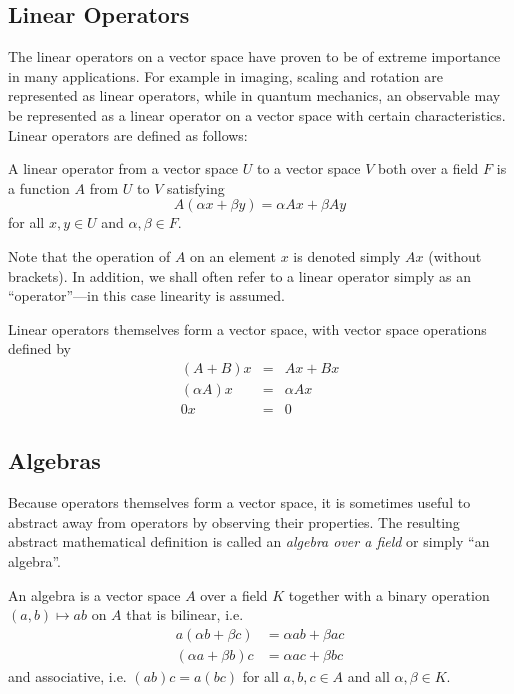\documentclass[12pt]{report}
\begin{document}
\subsection{Linear Operators}
\label{operators}

The linear operators on a vector space have proven to be of extreme importance in many applications. For example in imaging, scaling and rotation are represented as linear operators, while in quantum mechanics, an observable may be represented as a linear operator on a vector space with certain characteristics. Linear operators are defined as follows:
\begin{defn}
A linear operator from a vector space $U$ to a vector space $V$ both over a field $F$ is a function $A$ from $U$ to $V$ satisfying
$$A(\alpha x + \beta y) = \alpha Ax + \beta Ay$$
for all $x,y \in U$ and $\alpha, \beta \in F$.
\end{defn}
Note that the operation of $A$ on an element $x$ is denoted simply $Ax$ (without brackets). In addition, we shall often refer to a linear operator simply as an ``operator''---in this case linearity is assumed.

Linear operators themselves form a vector space, with vector space operations defined by
\begin{eqnarray*}
(A + B)x&=&Ax + Bx\\
(\alpha A)x&=&\alpha Ax\\
0x&=&0
\end{eqnarray*}

\subsection{Algebras}

Because operators themselves form a vector space, it is sometimes useful to abstract away from operators by observing their properties. The resulting abstract mathematical definition is called an \emph{algebra over a field} or simply ``an algebra''.
\begin{defn}
An algebra is a vector space $A$ over a field $K$ together with a binary operation $(a,b)\mapsto ab$ on $A$ that is bilinear, i.e.
\begin{align*}
a(\alpha b + \beta c) &= \alpha ab + \beta ac\\
(\alpha a+\beta b)c &= \alpha ac + \beta bc
\end{align*}
and associative, i.e. $(ab)c = a(bc)$ for all $a,b,c\in A$ and all $\alpha,\beta \in K$.
\end{defn}
\end{document}
